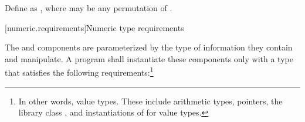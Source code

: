 %
\pnum
Define  as
,
where
 may be any permutation of .

[numeric.requirements]{Numeric type requirements}

\pnum
The
and
components are parameterized by the type of information they contain and manipulate.
A \Cpp{} program shall instantiate these components only with a type
that satisfies the
following requirements:\footnote{In other words, value types.
These include arithmetic types,
pointers, the library class
,
and instantiations of
for value types.}

